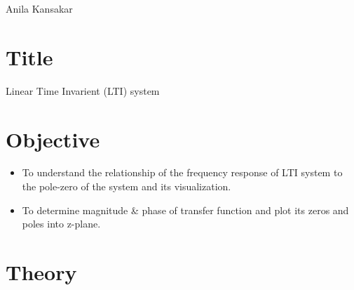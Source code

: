 \documentclass[a4paper,11pt]{article}
\begin{document}
{Anila  Kansakar}

\renewcommand{\contentsname}{Table of Contents}
\tableofcontents

\pagebreak
\lstlistoflistings
\vspace{10em}
\listoffigures
\pagebreak
{}

\section{Title} {\large Linear Time Invarient (LTI) system}
\section{Objective}
\begin {itemize}
\item To understand the relationship of the frequency response of LTI system to the pole-zero of the system and its visualization.
\item To determine magnitude \& phase of transfer function and plot its zeros and poles into z-plane.
\end{itemize}


\section{Theory}
\end{document}
